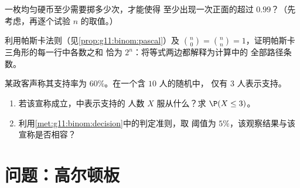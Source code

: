 \begin{exercise}[$\star\star$]\label{exo:g11:binom:9}
一枚均匀硬币至少需要掷多少次，才能使得
至少出现一次正面的超过 $0.99$？（先考虑，再逐个试验
$n$ 的取值。）
\end{exercise}

\begin{exercise}[$\star\star$]\label{exo:g11:binom:10}
利用帕斯卡法则（见\cref{prop:g11:binom:pascal}）及
$\binom n0 = \binom nn = 1$，证明帕斯卡三角形的每一行中各数之和
恰为 $2^n$：将等式两边都解释为计算中的
全部路径条数。
\end{exercise}

\begin{exercise}[$\star\star\star$]\label{exo:g11:binom:11}
某政客声称其支持率为 $60\%$。在一个含 $10$ 人的随机中，
仅有 $3$ 人表示支持。
\begin{enumerate}
  \item 若该宣称成立，中表示支持的
        人数 $X$ 服从什么？求 $\P(X \leq 3)$。
  \item 利用\cref{met:g11:binom:decision}中的判定准则，取
        阈值为 $5\%$，该观察结果与该宣称是否相容？
\end{enumerate}
\end{exercise}

\section{问题：高尔顿板}

